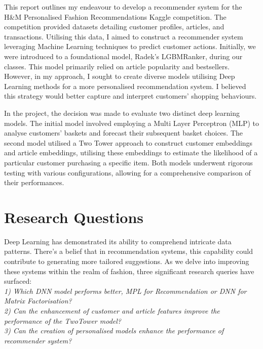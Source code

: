 \documentclass[conference,compsoc]{IEEEtran}
\begin{document}
This report outlines my endeavour to develop a recommender system for the H\&M Personalised Fashion Recommendations Kaggle competition. The competition provided datasets detailing customer profiles, articles, and transactions. Utilising this data, I aimed to construct a recommender system leveraging Machine Learning techniques to predict customer actions. Initially, we were introduced to a foundational model, Radek’s LGBMRanker, during our classes. This model primarily relied on article popularity and bestsellers. However, in my approach, I sought to create diverse models utilising Deep Learning methods for a more personalised recommendation system. I believed this strategy would better capture and interpret customers' shopping behaviours.

In the project, the decision was made to evaluate two distinct deep learning models. The initial model involved employing a Multi Layer Perceptron (MLP) to analyse customers' baskets and forecast their subsequent basket choices. The second model utilised a Two Tower approach to construct customer embeddings and article embeddings, utilising these embeddings to estimate the likelihood of a particular customer purchasing a specific item. Both models underwent rigorous testing with various configurations, allowing for a comprehensive comparison of their performances.

\section{Research Questions}

Deep Learning has demonstrated its ability to comprehend intricate data patterns. There's a belief that in recommendation systems, this capability could contribute to generating more tailored suggestions. As we delve into improving these systems within the realm of fashion, three significant research queries have surfaced:
\vspace{10pt}\\
\textit{1) Which DNN model performs better, MPL for Recommendation or DNN for Matrix Factorisation?}
\vspace{10pt}\\
\textit{2) Can the enhancement of customer and article features improve the performance of the TwoTower model?}
\vspace{10pt}\\
\textit{3) Can the creation of personalised models enhance the performance of recommender system?}
\vspace{12pt}
\end{document}
